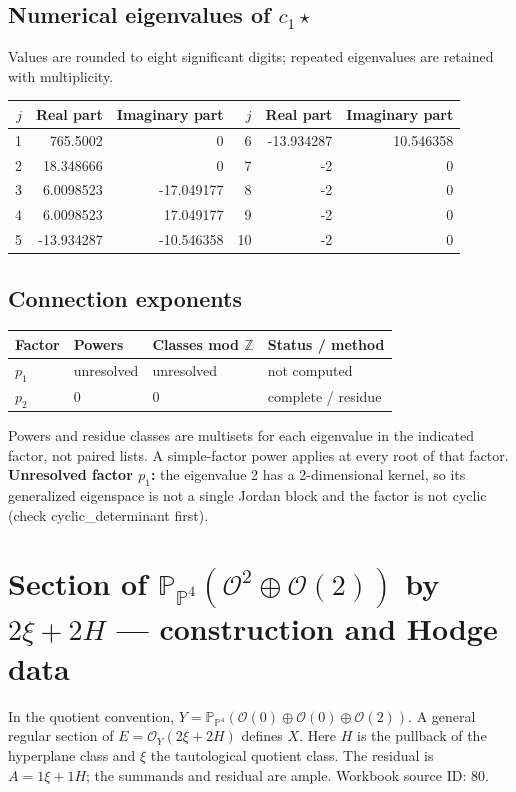 \documentclass[10pt,a4paper]{article}
\begin{document}
\subsection*{Numerical eigenvalues of $c_1\star$}
Values are rounded to eight significant digits; repeated eigenvalues are retained with multiplicity.
\begin{center}\small\begin{tabular}{rrr@{\qquad}rrr}\toprule $j$ & Real part & Imaginary part & $j$ & Real part & Imaginary part\\\midrule
1 & 765.5002 & 0 & 6 & -13.934287 & 10.546358\\
2 & 18.348666 & 0 & 7 & -2 & 0\\
3 & 6.0098523 & -17.049177 & 8 & -2 & 0\\
4 & 6.0098523 & 17.049177 & 9 & -2 & 0\\
5 & -13.934287 & -10.546358 & 10 & -2 & 0\\
\bottomrule\end{tabular}\end{center}
\subsection*{Connection exponents}
\begin{center}\begin{tabular}{llll}\toprule Factor & Powers & Classes mod $\mathbb Z$ & Status / method\\\midrule
$p_{1}$ & unresolved & unresolved & not computed\\
$p_{2}$ & $0$ & $0$ & complete / residue\\
\bottomrule\end{tabular}\end{center}
Powers and residue classes are multisets for each eigenvalue in the indicated factor, not paired lists. A simple-factor power applies at every root of that factor.
\textbf{Unresolved factor $p_{1}$:} the eigenvalue 2 has a 2-dimensional kernel, so its generalized eigenspace is not a single Jordan block and the factor is not cyclic (check cyclic\_determinant first).
\clearpage\section*{Section of $\mathbb P_{\mathbb P^{4}}(\mathcal O^{2}\oplus \mathcal O(2))$ by $2\xi +2H$ --- construction and Hodge data}\label{entry:PB5-080}
In the quotient convention, $Y=\mathbb P_{\mathbb P^{4}}(\mathcal O(0)\oplus\mathcal O(0)\oplus\mathcal O(2))$.
A general regular section of $E=\mathcal O_Y(2\xi+2H)$ defines $X$.
Here $H$ is the pullback of the hyperplane class and $\xi$ the tautological quotient class. The residual is $A=1\xi+1H$; the summands and residual are ample.
Workbook source ID: 80.
\end{document}
